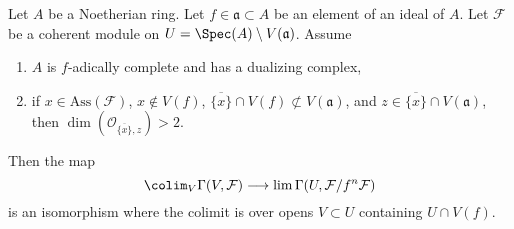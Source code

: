 \begin{proposition}
\label{proposition-alternative-colim-H0}
Let $A$ be a Noetherian ring. Let $f \in \mathfrak a \subset A$
be an element of an ideal of $A$. Let $\mathcal{F}$ be a coherent
module on $U = \Spec(A) \setminus V(\mathfrak a)$. Assume
\begin{enumerate}
\item $A$ is $f$-adically complete and has a dualizing complex,
\item if $x \in \text{Ass}(\mathcal{F})$, $x \not \in V(f)$,
$\overline{\{x\}} \cap V(f) \not \subset V(\mathfrak a)$,
and $z \in \overline{\{x\}} \cap V(\mathfrak a)$, then
$\dim(\mathcal{O}_{\overline{\{x\}}, z}) > 2$.
\end{enumerate}
Then the map
$$
\colim_V \Gamma(V, \mathcal{F})
\longrightarrow
\lim \Gamma(U, \mathcal{F}/f^n\mathcal{F})
$$
is an isomorphism where the colimit is over opens $V \subset U$
containing $U \cap V(f)$.
\end{proposition}

